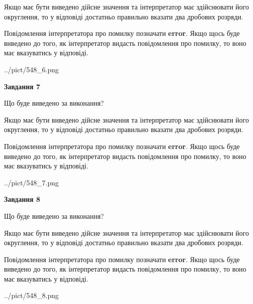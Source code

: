 \documentclass[12pt, ukrainian]{article}
\begin{document}
{\begin {Large}
Якщо має бути виведено дійсне значення та інтерпретатор має здійснювати його округлення, 
то у відповіді достатньо правильно вказати два дробових розряди.

Повідомлення інтерпретатора про помилку позначати \textbf{error}.
Якщо щось буде виведено до того, як інтерпретатор видасть повідомлення про помилку, 
то воно має вказуватись у відповіді. \par

\begin{center}
	{../pict/548_6.png}
\end{center}
\newpage

{\begin {center}\textbf{Завдання 7}\end {center}}\par
Що буде виведено за виконання? \par

Якщо має бути виведено дійсне значення та інтерпретатор має здійснювати його округлення, 
то у відповіді достатньо правильно вказати два дробових розряди.

Повідомлення інтерпретатора про помилку позначати \textbf{error}.
Якщо щось буде виведено до того, як інтерпретатор видасть повідомлення про помилку, 
то воно має вказуватись у відповіді. \par

\begin{center}
	{../pict/548_7.png}
\end{center}
\newpage

{\begin {center}\textbf{Завдання 8}\end {center}}\par
Що буде виведено за виконання? \par

Якщо має бути виведено дійсне значення та інтерпретатор має здійснювати його округлення, 
то у відповіді достатньо правильно вказати два дробових розряди.

Повідомлення інтерпретатора про помилку позначати \textbf{error}.
Якщо щось буде виведено до того, як інтерпретатор видасть повідомлення про помилку, 
то воно має вказуватись у відповіді. \par

\begin{center}
	{../pict/548_8.png}
\end{center}
\newpage


\end{Large}}
\end{document}
